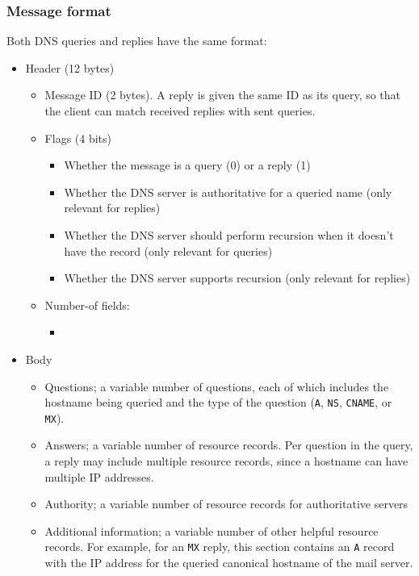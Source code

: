 \documentclass[8pt, table, xcdraw]{article}%
\begin{document}
\subsubsection{Message format}

Both DNS queries and replies have the same format:

\begin{itemize}
    \item Header (12 bytes)
    \begin{itemize}
        \item Message ID (2 bytes). A reply is given the same ID as its query, so that the client can match received replies with sent queries.
        \item Flags (4 bits)
        \begin{itemize}
            \item Whether the message is a query (0) or a reply (1)
            \item Whether the DNS server is authoritative for a queried name (only relevant for replies)
            \item Whether the DNS server should perform recursion when it doesn't have the record (only relevant for queries)
            \item Whether the DNS server supports recursion (only relevant for replies)
        \end{itemize}
        \item Number-of fields:
        \begin{itemize}
            \item 
        \end{itemize}
    \end{itemize}
    \item Body
    \begin{itemize}
        \item Questions; a variable number of questions, each of which includes the hostname being queried and the type of the question (\texttt{A}, \texttt{NS}, \texttt{CNAME}, or \texttt{MX}).
        \item Answers; a variable number of resource records. Per question in the query, a reply may include multiple resource records, since a hostname can have multiple IP addresses.
        \item Authority; a variable number of resource records for authoritative servers
        \item Additional information; a variable number of other helpful resource records. For example, for an \texttt{MX} reply, this section contains an \texttt{A} record with the IP address for the queried canonical hostname of the mail server.
    \end{itemize}
\end{itemize}
\end{document}
